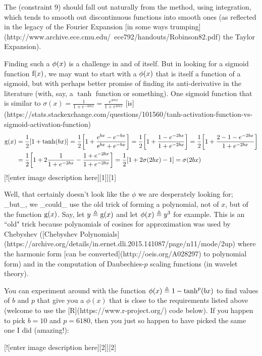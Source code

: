 The (constraint 9) should fall out naturally from the method, using integration, 
which tends to smooth out discontinuous functions into smooth ones 
(as reflected in the legacy of the Fourier Expansion 
[in some ways trumping](http://www.archive.ece.cmu.edu/~ece792/handouts/Robinson82.pdf) the Taylor Expansion).

Finding such a $\mathrm{\phi}(x)$ is a challenge in and of itself. 
But in looking for a sigmoid function $\mathrm{f}(x)$, we may want to start with a $\mathrm{\phi}(x)$ that is itself a function of a sigmoid,
but with perhaps better promise of finding its anti-derivative in the literature (with, say, a $\tanh$ function or something). 
One sigmoid function that is similar to $\sigma(x)=\frac{1}{1+e^{-4mx}}=\frac{e^{4mx}}{1+e^{4mx}}$ 
[is](https://stats.stackexchange.com/questions/101560/tanh-activation-function-vs-sigmoid-activation-function) 
\begin{align*}
  \mathrm{g}(x) &= \frac{1}{2} {\left[ 1+\tanh(bx) \right]}
          = \frac{1}{2} {\left[ 1+\frac{e^{bx}-e^{-bx}}{e^{bx}+e^{-bx}} \right]}
          = \frac{1}{2} {\left[ 1+\frac{1-e^{-2bx}}{1+e^{-2bx}} \right]}
          = \frac{1}{2} {\left[ 1+\frac{2-1-e^{-2bx}}{1+e^{-2bx}} \right]}
       \\&= \frac{1}{2} {\left[ 1+2\frac{1}{1+e^{-2bx}} - \frac{1+e^{-2bx}}{1+e^{-2bx}} \right]}
          = \frac{1}{2} {\left[ 1+2\sigma(2bx) - 1 \right]}
          = \sigma(2bx)
\end{align*}
[![enter image description here][1]][1]

Well, that certainly doesn't look like the $\phi$ we are desperately looking for; _but_, 
we _could_ use the old trick of forming a polynomial, not of $x$, but of the function $\mathrm{g}(x)$. 
Say, let $y\triangleq\mathrm{g}(x)$ and let $\phi(x)\triangleq y^3$ for example.
This is an ``old" trick because polynomials of cosines for approximation was used by 
Chebyshev ([Chebyshev Polynomials](https://archive.org/details/in.ernet.dli.2015.141087/page/n11/mode/2up)
where the harmonic form [can be converted](http://oeis.org/A028297) to polynomial form)
and in the computation of Daubechies-$p$ scaling functions (in wavelet theory).

You can experiment around with the function $\mathrm{\phi}(x)\triangleq 1-\tanh^p(bx)$ to find values of $b$ and $p$ that give you a $\phi(x)$ 
that is close to the requirements listed above (welcome to use the [R](https://www.r-project.org/) code below). 
If you happen to pick $b=10$ and $p=6180$, then you just so happen to have picked the same one I did (amazing!):

[![enter image description here][2]][2]
 
